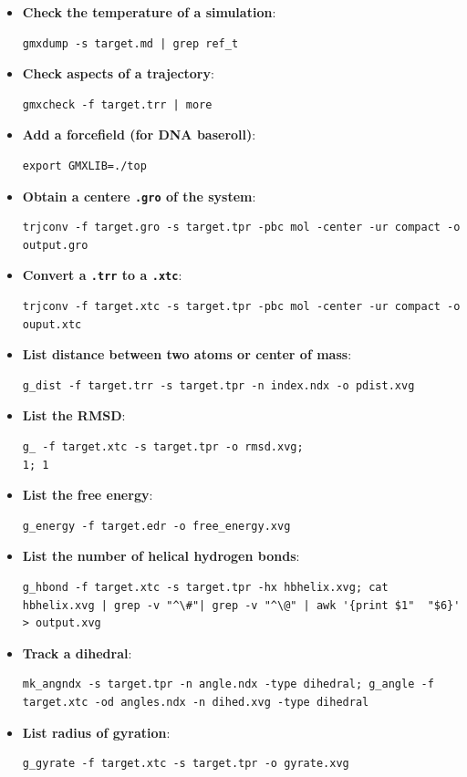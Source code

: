 \documentclass[]{article}
\begin{document}
\begin{itemize}
\item \textbf{Check the temperature of a simulation}: \begin{verbatim}gmxdump -s target.md | grep ref_t\end{verbatim}
\item \textbf{Check aspects of a trajectory}: \begin{verbatim}gmxcheck -f target.trr | more\end{verbatim}
\item \textbf{Add a forcefield (for DNA baseroll)}: \begin{verbatim}export GMXLIB=./top\end{verbatim}
\item \textbf{Obtain a centere \texttt{.gro} of the system}: \begin{verbatim}trjconv -f target.gro -s target.tpr -pbc mol -center -ur compact -o output.gro\end{verbatim}
\item \textbf{Convert a \texttt{.trr} to a \texttt{.xtc}}: \begin{verbatim}trjconv -f target.xtc -s target.tpr -pbc mol -center -ur compact -o ouput.xtc\end{verbatim}
\item \textbf{List distance between two atoms or center of mass}: \begin{verbatim}g_dist -f target.trr -s target.tpr -n index.ndx -o pdist.xvg\end{verbatim}
\item \textbf{List the RMSD}: \begin{verbatim}g_ -f target.xtc -s target.tpr -o rmsd.xvg;
1; 1\end{verbatim}
\item \textbf{List the free energy}: \begin{verbatim}g_energy -f target.edr -o free_energy.xvg\end{verbatim}
\item \textbf{List the number of helical hydrogen bonds}: \begin{verbatim}g_hbond -f target.xtc -s target.tpr -hx hbhelix.xvg; cat hbhelix.xvg | grep -v "^\#"| grep -v "^\@" | awk '{print $1"  "$6}' > output.xvg\end{verbatim}
\item \textbf{Track a dihedral}: \begin{verbatim}mk_angndx -s target.tpr -n angle.ndx -type dihedral; g_angle -f target.xtc -od angles.ndx -n dihed.xvg -type dihedral\end{verbatim}
\item \textbf{List radius of gyration}: \begin{verbatim}g_gyrate -f target.xtc -s target.tpr -o gyrate.xvg\end{verbatim}
\end{itemize}
\end{document}

